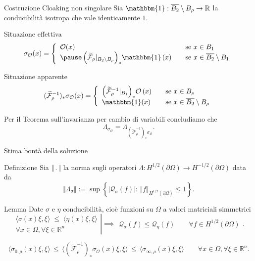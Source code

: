 \documentclass{beamer}
\newcommand{\bbR}{\mathbb{R}}
\newcommand{\de}{\partial}
\newcommand{\OO}{\mathcal{O}}
\newcommand{\F}{\mathcal{F}}
\newcommand{\Ft}{\widetilde{\F}}
\newcommand{\1}{\mathbbm{1}}
\begin{document}
\begin{frame}{Costruzione Cloaking non singolare}
Sia $\1:\overline{B_2}\setminus B_\rho \rightarrow \bbR$ la conducibilità isotropa che vale identicamente $1$.
\pause
\begin{block}{Situazione effettiva}
\begin{equation*}
\sigma_\OO(x) = 
	\left\{\begin{array}{lll}
         \OO(x) & & \text{se } x\in B_1 \\ \pause
         \left(\Ft_\rho|_{B_2\setminus B_\rho}\right)_*\!\1\,(x) & & \text{se } x\in \overline{B_2}\setminus B_1
    \end{array}\right.
\end{equation*}
\end{block}
\pause
\begin{block}{Situazione apparente}
\begin{equation*}
(\Ft_\rho^{-1})_*\sigma_\OO(x) = 
	\left\{\begin{array}{lll}
         \left(\Ft_\rho^{-1}|_{B_1}\right)_*\!\OO\,(x) & & \text{se } x\in B_\rho \\
         \1(x) & & \text{se } x\in \overline{B_2}\setminus B_\rho
    \end{array}\right.
\end{equation*}
\end{block}
\pause
Per il Teorema sull'invarianza per cambio di variabili concludiamo che 
\[
\Lambda_{\sigma_\OO} = \Lambda_{(\Ft_\rho^{-1})_*\sigma_\OO}.
\]
\end{frame}


\begin{frame}{Stima bontà della soluzione}
\begin{block}{Definizione}
Sia $\Vert \,.\, \Vert$ la norma sugli operatori $\Lambda: H^{1/2}(\de\Omega) \rightarrow H^{-1/2}(\de\Omega)$ data da
\[
\Vert\Lambda_\sigma\Vert := \sup\left\{|\mathcal{Q}_\sigma(f)|   :\,\Vert f\Vert_{H^{1/2}(\de\Omega)}\leq1\right\}.
\]
\end{block}

\pause
\begin{block}{Lemma}
Date $\sigma$ e $\eta$ conducibilità, cioè funzioni su $\Omega$ a valori matriciali simmetrici
\[ 
	\left. \begin{array}{c}
         \langle\sigma(x)\xi,\xi\rangle \;\le\; \langle\eta(x)\xi,\xi\rangle \\
         \forall x\in\Omega, \forall\xi\in\mathbb{R}^n
    \end{array}
\right|\implies
	\begin{array}{c}
         \mathcal{Q}_\sigma(f) \le \mathcal{Q}_\eta(f) \qquad \forall f\in H^{1/2}(\de\Omega)
    \end{array}.
\]
\end{block}
\pause
\[
\langle\sigma_{0,\rho}(x)\xi,\xi\rangle 
\,\le\, 
\langle(\Ft_\rho^{-1})_*\sigma_\OO(x)\xi,\xi\rangle 
\,\le\, 
\langle\sigma_{\infty,\rho}(x)\xi,\xi\rangle
\qquad
         \forall x\in\Omega, \forall\xi\in\mathbb{R}^n.
\]
\end{frame}
\end{document}
